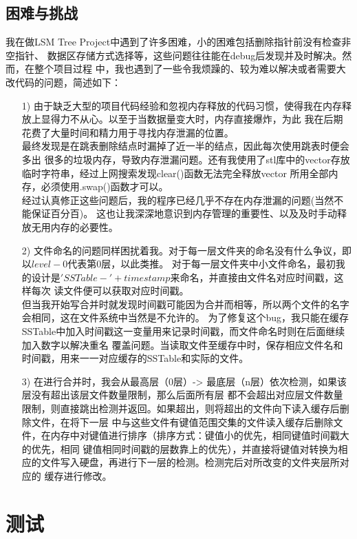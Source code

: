 \documentclass{article}
\begin{document}
\subsection{困难与挑战}
我在做LSM Tree Project中遇到了许多困难，小的困难包括删除指针前没有检查非空指针、
数据区存储方式选择等，这些问题往往能在debug后发现并及时解决。然而，在整个项目过程
中，我也遇到了一些令我烦躁的、较为难以解决或者需要大改代码的问题，简述如下：
\begin{itemize}
    \item [1)] 
    由于缺乏大型的项目代码经验和忽视内存释放的代码习惯，使得我在内存释放上显得力不从心。以至于当数据量变大时，内存直接爆炸，为此
    我在后期花费了大量时间和精力用于寻找内存泄漏的位置。\\
    最终发现是在跳表删除结点时漏掉了近一半的结点，因此每次使用跳表时便会多出
    很多的垃圾内存，导致内存泄漏问题。还有我使用了stl库中的vector存放临时字符串，经过上网搜索发现clear()函数无法完全释放vector
    所用全部内存，必须使用.swap()函数才可以。\\
    经过认真修正这些问题后，我的程序已经几乎不存在内存泄漏的问题(当然不能保证百分百)。
    这也让我深深地意识到内存管理的重要性、以及及时手动释放无用内存的必要性。       
    \item [2)]
    文件命名的问题同样困扰着我。对于每一层文件夹的命名没有什么争议，即以$level-0$代表第0层，以此类推。
    对于每一层文件夹中小文件命名，最初我的设计是$'SSTable-' + timestamp$来命名，并直接由文件名对应时间戳，这样每次
    读文件便可以获取对应时间戳。\\
    但当我开始写合并时就发现时间戳可能因为合并而相等，所以两个文件的名字会相同，这在文件系统中当然是不允许的。
    为了修复这个bug，我只能在缓存SSTable中加入时间戳这一变量用来记录时间戳，而文件命名时则在后面继续加入数字以解决重名
    覆盖问题。当读取文件至缓存中时，保存相应文件名和时间戳，用来一一对应缓存的SSTable和实际的文件。
    \item [3)]
    在进行合并时，我会从最高层（0层）-> 最底层（n层）依次检测，如果该层没有超出该层文件数量限制，那么后面所有层
    都不会超出对应层文件数量限制，则直接跳出检测并返回。如果超出，则将超出的文件向下读入缓存后删除文件，在将下一层
    中与这些文件有键值范围交集的文件读入缓存后删除文件，在内存中对键值进行排序（排序方式：键值小的优先，相同键值时间戳大的优先，相同
    键值相同时间戳的层数靠上的优先），并直接将键值对转换为相应的文件写入硬盘，再进行下一层的检测。检测完后对所改变的文件夹层所对应的
    缓存进行修改。
\end{itemize}

\section{测试}
\end{document}
